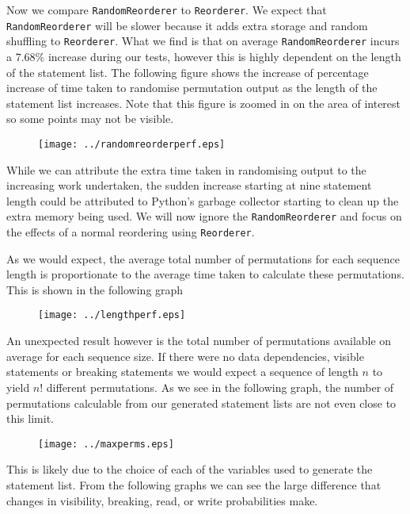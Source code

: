 \documentclass[twoside,a4paper]{report}
\begin{document}
Now we compare \texttt{RandomReorderer} to \texttt{Reorderer}. We expect that \texttt{RandomReorderer} will be slower because it adds extra storage and random
shuffling to \texttt{Reorderer}. What we find is that on average \texttt{RandomReorderer} incurs a $7.68\%$ increase during our tests, however this is highly
dependent on the length of the statement list. The following figure shows the increase of percentage increase of time taken to randomise permutation output
as the length of the statement list increases. Note that this figure is zoomed in on the area of interest so some points may not be visible.

\begin{figure}[h]
\centering
\scalebox{0.75}
{\texttt{[image: ../randomreorderperf.eps]}}
\end{figure}

While we can attribute the extra time taken in randomising output to the increasing work undertaken, the sudden increase starting at nine
statement length could be attributed to Python's garbage collector starting to clean up the extra memory being used. We will now ignore the
\texttt{RandomReorderer} and focus on the effects of a normal reordering using \texttt{Reorderer}.

As we would expect, the average total number of permutations for each sequence length is proportionate to the average time taken to calculate these permutations.
This is shown in the following graph

\begin{figure}[h]
\centering
\scalebox{0.75}
{\texttt{[image: ../lengthperf.eps]}}
\end{figure}

An unexpected result however is the total number of permutations available on average for each sequence size. If there were no data dependencies, visible statements
or breaking statements we would expect a sequence of length $n$ to yield $n!$ different permutations. As we see in the following graph, the number of permutations
calculable from our generated statement lists are not even close to this limit.

\begin{figure}[h]
\centering
\scalebox{0.75}
{\texttt{[image: ../maxperms.eps]}}
\end{figure}

This is likely due to the choice of each of the variables used to generate the statement list. From the following graphs we can see the large
difference that changes in visibility, breaking, read, or write probabilities make.
\end{document}
